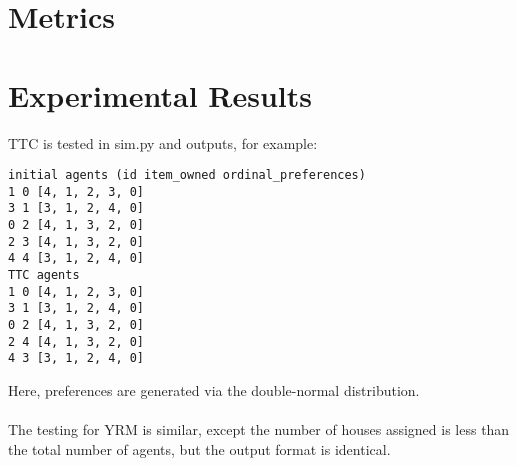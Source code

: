 \documentclass[12pt]{article}
\begin{document}
\section*{Metrics}
\section*{Experimental Results}
TTC is tested in sim.py and outputs, for example:
\begin{verbatim}
initial agents (id item_owned ordinal_preferences)
1 0 [4, 1, 2, 3, 0]
3 1 [3, 1, 2, 4, 0]
0 2 [4, 1, 3, 2, 0]
2 3 [4, 1, 3, 2, 0]
4 4 [3, 1, 2, 4, 0]
TTC agents
1 0 [4, 1, 2, 3, 0]
3 1 [3, 1, 2, 4, 0]
0 2 [4, 1, 3, 2, 0]
2 4 [4, 1, 3, 2, 0]
4 3 [3, 1, 2, 4, 0]
\end{verbatim}
Here, preferences are generated via the double-normal distribution.\\\\The testing for YRM is similar, except the number of houses assigned is less than the total number of agents, but the output format is identical.
\end{document}
